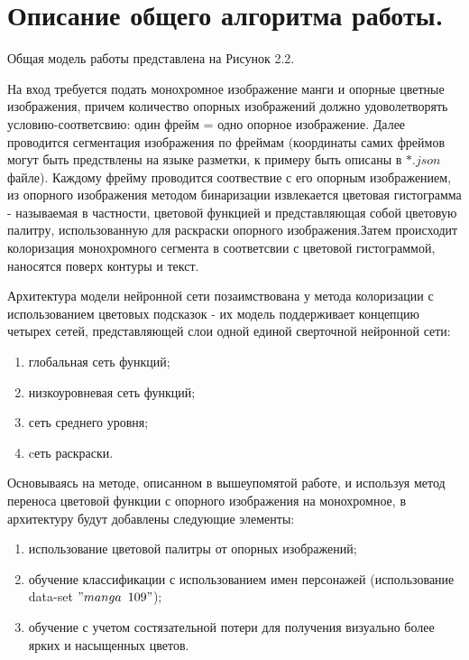 \newpage
 \section{Описание общего алгоритма работы.}
 Общая модель работы представлена на Рисунок 2.2.
 
 На вход требуется подать монохромное изображение манги и опорные цветные изображения, причем количество опорных изображений должно удоволетворять условию-соответсвию: один фрейм = одно опорное изображение. Далее проводится сегментация изображения по фреймам (координаты самих фреймов могут быть предствлены на языке разметки, к примеру быть описаны в $*.json$ файле). Каждому фрейму проводится соотвествие с его опорным изображением, из опорного изображения методом бинаризации извлекается цветовая гистограмма - называемая в частности, цветовой функцией и представляющая собой цветовую палитру, использованную для раскраски опорного изображения.Затем происходит колоризация монохромного сегмента в соответсвии с цветовой гистограммой, наносятся поверх контуры и текст. 

\begin{figure}[ht!]
\end{figure}

Архитектура модели нейронной сети позаимствована у метода колоризации с использованием цветовых подсказок - их модель поддерживает концепцию четырех сетей, представляющей слои одной единой сверточной нейронной сети:
\begin{enumerate}
	\item глобальная сеть функций;
	\item низкоуровневая сеть функций;
	\item сеть среднего уровня;
	\item cеть раскраски.
\end{enumerate}

Основываясь на методе, описанном в вышеупомятой работе, и используя метод переноса цветовой функции с опорного изображения на монохромное, в архитектуру будут добавлены следующие элементы:
\begin{enumerate}
	\item использование цветовой палитры от опорных изображений;
	\item обучение классификации с использованием имен персонажей (использование data-set $"manga$ $109"$);
	\item обучение с учетом состязательной потери для получения визуально более ярких и насыщенных цветов.
\end{enumerate}

